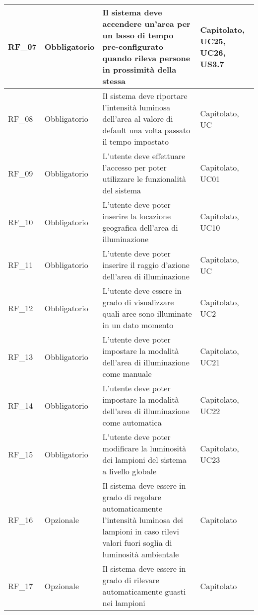 \begin{center}
\begin{xltabular}{\linewidth}{|l|l|X|l|}
        \hline
        RF\_07 & Obbligatorio & Il sistema deve accendere un'area per un lasso di tempo pre-configurato quando rileva persone in prossimità della stessa & Capitolato, UC25, UC26, US3.7 \\

        \hline
        RF\_08 & Obbligatorio & Il sistema deve riportare l'intensità luminosa dell'area al valore di default una volta passato il tempo impostato & Capitolato, UC \\ %

        \hline
        RF\_09 & Obbligatorio & L'utente deve effettuare l'accesso per poter utilizzare le funzionalità del sistema & Capitolato, UC01\\

        \hline
        RF\_10 & Obbligatorio & L'utente deve poter inserire la locazione geografica dell'area di illuminazione & Capitolato, UC10\\

        \hline
        RF\_11 & Obbligatorio & L'utente deve poter inserire il raggio d'azione dell'area di illuminazione & Capitolato, UC\\ %

        \hline
        RF\_12 & Obbligatorio & L'utente deve essere in grado di visualizzare quali aree sono illuminate in un dato momento & Capitolato, UC2\\

        \hline
        RF\_13 & Obbligatorio & L'utente deve poter impostare la modalità dell'area di illuminazione come manuale & Capitolato, UC21\\

        \hline
        RF\_14 & Obbligatorio & L'utente deve poter impostare la modalità dell'area di illuminazione come automatica & Capitolato, UC22\\

        \hline
        RF\_15 & Obbligatorio & L'utente deve poter modificare la luminosità dei lampioni del sistema a livello globale & Capitolato, UC23\\

        \hline
        RF\_16 & Opzionale & Il sistema deve essere in grado di regolare automaticamente l'intensità luminosa dei lampioni in caso rilevi valori fuori soglia di luminosità ambientale & Capitolato\\

        \hline
        RF\_17 & Opzionale & Il sistema deve essere in grado di rilevare automaticamente guasti nei lampioni & Capitolato \\


\end{xltabular}
\end{center}
